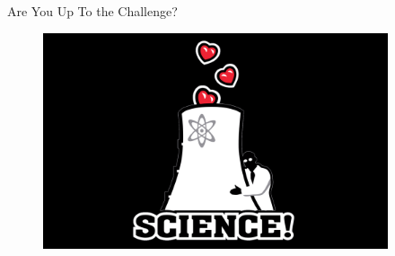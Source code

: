 \documentclass[xcolor=x11names,compress]{beamer}
\renewcommand{\(}{\begin{columns}}
\renewcommand{\)}{\end{columns}}
\newcommand{\<}[1]{\begin{column}{#1}}
\renewcommand{\>}{\end{column}}
\begin{document}
%
%

\begin{frame}{Are You Up To the Challenge?}
\begin{figure}
\includegraphics[height=2.5in,clip]{../figs/science}
\end{figure}
\end{frame}
\end{document}
